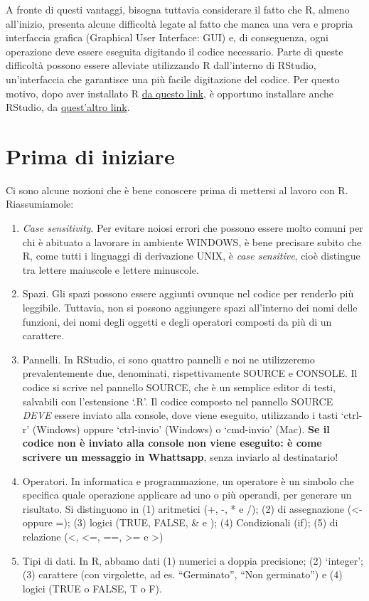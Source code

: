 \documentclass[a4paper,12pt,oneside]{book}
\providecommand{\tightlist}{%
  \setlength{\itemsep}{0pt}\setlength{\parskip}{0pt}}
\begin{document}
A fronte di questi vantaggi, bisogna tuttavia considerare il fatto che R, almeno all'inizio, presenta alcune difficoltà legate al fatto che manca una vera e propria interfaccia grafica (Graphical User Interface: GUI) e, di conseguenza, ogni operazione deve essere eseguita digitando il codice necessario. Parte di queste difficoltà possono essere alleviate utilizzando R dall'interno di RStudio, un'interfaccia che garantisce una più facile digitazione del codice. Per questo motivo, dopo aver installato R \href{https://cran.r-project.org}{da questo link}, è opportuno installare anche RStudio, da \href{https://posit.co}{quest'altro link}.

\hypertarget{prima-di-iniziare}{%
\section{Prima di iniziare}\label{prima-di-iniziare}}

Ci sono alcune nozioni che è bene conoscere prima di mettersi al lavoro con R. Riassumiamole:

\begin{enumerate}
\def\labelenumi{\arabic{enumi}.}
\tightlist
\item
  \emph{Case sensitivity}. Per evitare noiosi errori che possono essere molto comuni per chi è abituato a lavorare in ambiente WINDOWS, è bene precisare subito che R, come tutti i linguaggi di derivazione UNIX, è \emph{case sensitive}, cioè distingue tra lettere maiuscole e lettere minuscole.
\item
  Spazi. Gli spazi possono essere aggiunti ovunque nel codice per renderlo più leggibile. Tuttavia, non si possono aggiungere spazi all'interno dei nomi delle funzioni, dei nomi degli oggetti e degli operatori composti da più di un carattere.
\item
  Pannelli. In RStudio, ci sono quattro pannelli e noi ne utilizzeremo prevalentemente due, denominati, rispettivamente SOURCE e CONSOLE. Il codice si scrive nel pannello SOURCE, che è un semplice editor di testi, salvabili con l'estensione `.R'. Il codice composto nel pannello SOURCE \emph{DEVE} essere inviato alla console, dove viene eseguito, utilizzando i tasti `ctrl-r' (Windows) oppure `ctrl-invio' (Windows) o `cmd-invio' (Mac). \textbf{Se il codice non è inviato alla console non viene eseguito: è come scrivere un messaggio in Whattsapp}, senza inviarlo al destinatario!
\item
  Operatori. In informatica e programmazione, un operatore è un simbolo che specifica quale operazione applicare ad uno o più operandi, per generare un risultato. Si distinguono in (1) aritmetici (+, -, * e /); (2) di assegnazione (\textless- oppure =); (3) logici (TRUE, FALSE, \& e \textbar); (4) Condizionali (if); (5) di relazione (\textless, \textless=, ==, \textgreater= e \textgreater)
\item
  Tipi di dati. In R, abbamo dati (1) numerici a doppia precisione; (2) `integer'; (3) carattere (con virgolette, ad es. ``Germinato'', ``Non germinato'') e (4) logici (TRUE o FALSE, T o F).
\end{enumerate}
\end{document}
